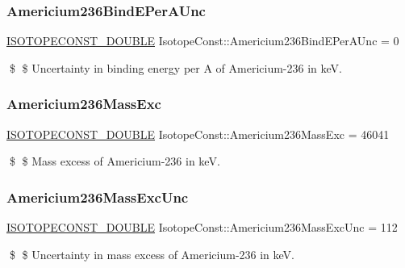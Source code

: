 \subsubsection{\texorpdfstring{Americium236\+Bind\+E\+Per\+A\+Unc}{Americium236BindEPerAUnc}}
{\footnotesize\ttfamily \mbox{\hyperlink{group___isotope_const-_macros_ga8f45a7272ce02c0b4c65c44636ed719a}{I\+S\+O\+T\+O\+P\+E\+C\+O\+N\+S\+T\+\_\+\+D\+O\+U\+B\+LE}} Isotope\+Const\+::\+Americium236\+Bind\+E\+Per\+A\+Unc = 0}

\$ \$ Uncertainty in binding energy per A of Americium-\/236 in keV. \mbox{\label{group___isotope_const-_americium-_am236_ga6058842ebccca24c51eaccd2c54f6528}} 
\subsubsection{\texorpdfstring{Americium236\+Mass\+Exc}{Americium236MassExc}}
{\footnotesize\ttfamily \mbox{\hyperlink{group___isotope_const-_macros_ga8f45a7272ce02c0b4c65c44636ed719a}{I\+S\+O\+T\+O\+P\+E\+C\+O\+N\+S\+T\+\_\+\+D\+O\+U\+B\+LE}} Isotope\+Const\+::\+Americium236\+Mass\+Exc = 46041}

\$ \$ Mass excess of Americium-\/236 in keV. \mbox{\label{group___isotope_const-_americium-_am236_gad7f5702ac4aaba8216a31a4003badb5e}} 
\subsubsection{\texorpdfstring{Americium236\+Mass\+Exc\+Unc}{Americium236MassExcUnc}}
{\footnotesize\ttfamily \mbox{\hyperlink{group___isotope_const-_macros_ga8f45a7272ce02c0b4c65c44636ed719a}{I\+S\+O\+T\+O\+P\+E\+C\+O\+N\+S\+T\+\_\+\+D\+O\+U\+B\+LE}} Isotope\+Const\+::\+Americium236\+Mass\+Exc\+Unc = 112}

\$ \$ Uncertainty in mass excess of Americium-\/236 in keV. \mbox{\label{group___isotope_const-_americium-_am236_ga22a544d3981fc8624a3f034f46842110}} 

